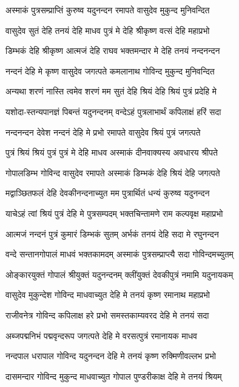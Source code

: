 \twolineshloka
{अस्माकं पुत्रसम्प्राप्तिं कुरुष्व यदुनन्दन}
{रमापते वासुदेव मुकुन्द मुनिवन्दित}%

\twolineshloka
{वासुदेव सुतं देहि तनयं देहि माधव}
{पुत्रं मे देहि श्रीकृष्ण वत्सं देहि महाप्रभो}%

\twolineshloka
{डिम्भकं देहि श्रीकृष्ण आत्मजं देहि राघव}
{भक्तमन्दार मे देहि तनयं नन्दनन्दन}%

\twolineshloka
{नन्दनं देहि मे कृष्ण वासुदेव जगत्पते}
{कमलानाथ गोविन्द मुकुन्द मुनिवन्दित}%

\twolineshloka
{अन्यथा शरणं नास्ति त्वमेव शरणं मम}
{सुतं देहि श्रियं देहि श्रियं पुत्रं प्रदेहि मे}%

\twolineshloka
{यशोदा-स्तन्यपानज्ञं पिबन्तं यदुनन्दनम्}
{वन्देऽहं पुत्रलाभार्थं कपिलाक्षं हरिं सदा}%

\twolineshloka
{नन्दनन्दन देवेश नन्दनं देहि मे प्रभो}
{रमापते वासुदेव श्रियं पुत्रं जगत्पते}%

\twolineshloka
{पुत्रं श्रियं श्रियं पुत्रं पुत्रं मे देहि माधव}
{अस्माकं दीनवाक्यस्य अवधारय श्रीपते}%

\twolineshloka
{गोपालडिम्भ गोविन्द वासुदेव रमापते}
{अस्माकं डिम्भकं देहि श्रियं देहि जगत्पते}%

\twolineshloka
{मद्वाञ्छितफलं देहि देवकीनन्दनाच्युत}
{मम पुत्रार्थितं धन्यं कुरुष्व यदुनन्दन}%

\twolineshloka
{याचेऽहं त्वां श्रियं पुत्रं देहि मे पुत्रसम्पदम्}
{भक्तचिन्तामणे राम कल्पवृक्ष महाप्रभो}%

\twolineshloka
{आत्मजं नन्दनं पुत्रं कुमारं डिम्भकं सुतम्}
{अर्भकं तनयं देहि सदा मे रघुनन्दन}%

\twolineshloka
{वन्दे सन्तानगोपालं माधवं भक्तकामदम्}
{अस्माकं पुत्रसम्प्राप्त्यै सदा गोविन्दमच्युतम्}%

\twolineshloka
{ओङ्कारयुक्तं गोपालं श्रीयुक्तं यदुनन्दनम्}
{क्लींयुक्तं देवकीपुत्रं नमामि यदुनायकम्}%

\twolineshloka
{वासुदेव मुकुन्देश गोविन्द माधवाच्युत}
{देहि मे तनयं कृष्ण रमानाथ महाप्रभो}%

\twolineshloka
{राजीवनेत्र गोविन्द कपिलाक्ष हरे प्रभो}
{समस्तकाम्यवरद देहि मे तनयं सदा}%

\twolineshloka
{अब्जपद्मनिभं पद्मवृन्दरूप जगत्पते}
{देहि मे वरसत्पुत्रं रमानायक माधव}%

\twolineshloka
{नन्दपाल धरापाल गोविन्द यदुनन्दन}
{देहि मे तनयं कृष्ण रुक्मिणीवल्लभ प्रभो}%

\twolineshloka
{दासमन्दार गोविन्द मुकुन्द माधवाच्युत}
{गोपाल पुण्डरीकाक्ष देहि मे तनयं श्रियम्}%

